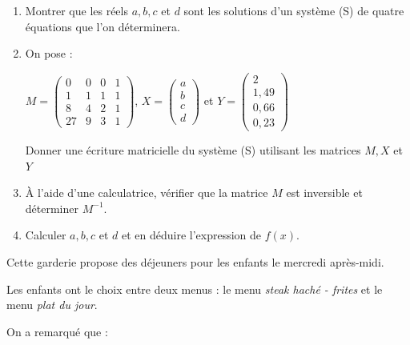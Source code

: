 \begin{enumerate}
     \item %
     Montrer que les réels $a, b, c$ et $d$ sont les solutions d'un système (S) de quatre équations que l'on déterminera.
     \item %
     On pose :
     \begin{center}
          $M = \begin{pmatrix}
               0 &0 &0 &1 \\
               1 &1 &1 &1 \\
               8 &4 &2 &1 \\
          27 &9 &3 &1  \end{pmatrix}$,
          $     X = \begin{pmatrix}
               a \\
               b \\
               c \\
          d  \end{pmatrix} $
          et
          $   Y = \begin{pmatrix}
               2 \\
               1,49 \\
               0,66 \\
          0,23 \end{pmatrix}$
     \end{center}
     Donner une écriture matricielle du système (S) utilisant les matrices $M, X$ et $Y$
     \item %
     \`A l'aide d'une calculatrice, vérifier que la matrice $M$ est inversible et déterminer $M^{-1}$.
     \item %
     Calculer $a, b, c$ et $d$ et en déduire l'expression de $f(x)$.
     \par
\end{enumerate}
\par
%
%
\par
Cette garderie propose des déjeuners pour les enfants le mercredi après-midi.
\par
Les enfants ont le choix entre deux menus : le menu \textit{steak haché - frites} et le menu \textit{plat du jour}.
\par
On a remarqué que :
\par
